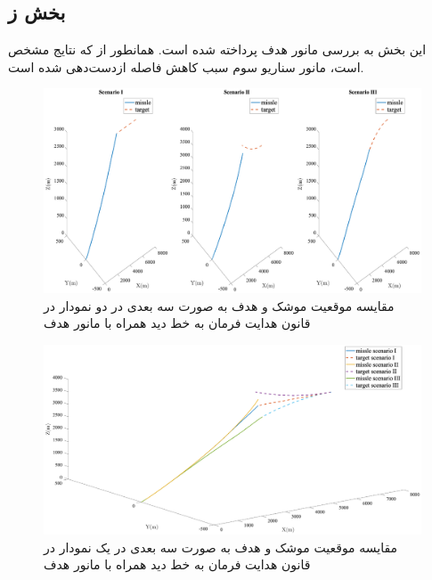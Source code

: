 \subsection{بخش ز}
این بخش به بررسی مانور هدف پرداخته شده است. همانطور از که نتایج مشخص است، مانور سناریو سوم سبب کاهش فاصله ازدست‌دهی شده است.

\begin{figure}[H]
	\centering
	\includegraphics[width=\linewidth]{../Figure/m/3DoF_missle_vs_target_state_lead_angle_all_scenario}
	\caption{مقایسه موقعیت موشک و هدف به صورت سه بعدی در دو نمودار  در قانون هدایت فرمان به خط دید همراه با مانور هدف
	}
\end{figure}


\begin{figure}[H]
	\centering
	\includegraphics[width=\linewidth]{../Figure/m/3DoF_missle_vs_target_state_lead_angle1_all_in}
	\caption{مقایسه موقعیت موشک و هدف به صورت سه بعدی در یک نمودار در قانون هدایت فرمان به خط دید همراه با مانور هدف
	}
\end{figure}

